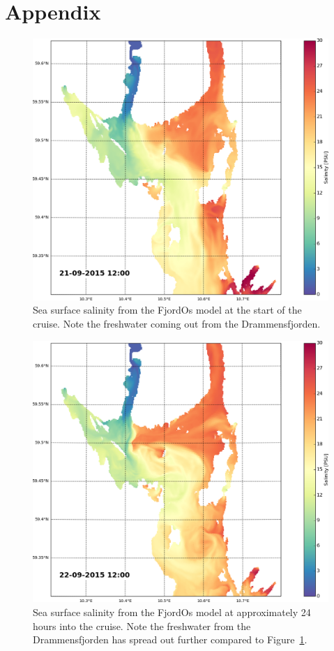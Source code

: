\documentclass[12pt,a4paper,english]{article}
\begin{document}
\clearpage
\section*{\hspace{17mm}Appendix}

\begin{figure}[ht]
\centerline{
\includegraphics*[width=1.0\textwidth]{Python/salthold_72}}
\caption{\small
Sea surface salinity from the FjordOs model at the start of the cruise. Note the freshwater coming out from the Drammensfjorden.
}
\label{fig:Salinity1}
\end{figure}

\begin{figure}[ht]
\centerline{
\includegraphics*[width=1.0\textwidth]{Python/salthold_96}}
\caption{\small
Sea surface salinity from the FjordOs model at approximately 24 hours into the cruise. Note the freshwater from the Drammensfjorden has spread out further compared to Figure~\ref{fig:Salinity1}.
}
\label{fig:Salinity2}
\end{figure}
\end{document}
